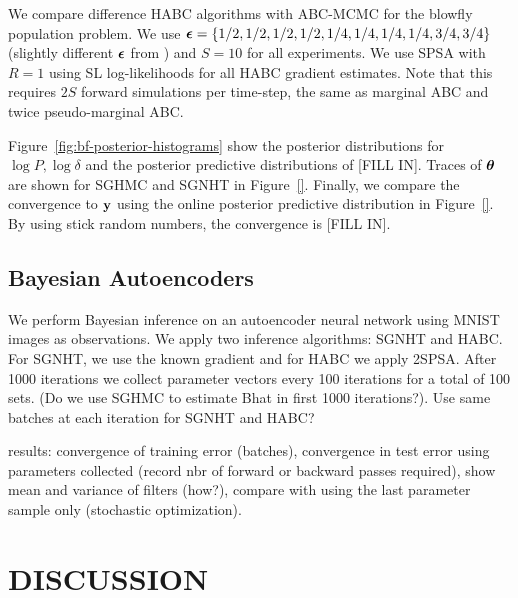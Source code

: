 \documentclass[]{article}
\begin{document}
We compare difference HABC algorithms with ABC-MCMC for the blowfly population problem.  We use ${\bm {\epsilon}} = \{ 1/2,1/2,1/2,1/2, 1/4,1/4,1/4,1/4,3/4,3/4 \}$ (slightly different ${\bm {\epsilon}}$ from \cite{Meeds2014GpsUai}) and $S=10$ for all experiments.  We use SPSA with $R=1$ using SL log-likelihoods for all HABC gradient estimates.  Note that this requires $2S$ forward simulations per time-step, the same as marginal ABC and twice pseudo-marginal ABC.  

Figure~\ref{fig:bf-posterior-histograms} show the posterior distributions for $\log P, \log \delta$ and the posterior predictive distributions of [FILL IN].  Traces of ${\bm \theta}$ are shown for SGHMC and SGNHT in Figure~\ref{}.  Finally, we compare the convergence to ${\bf y}$ using the online posterior predictive distribution in Figure~\ref{}.  By using stick random numbers, the convergence is [FILL IN].
  



\subsection{Bayesian Autoencoders}\label{sec:auto}
We perform Bayesian inference on an autoencoder neural network using MNIST images as observations.  We apply two inference algorithms: SGNHT and HABC.  For SGNHT, we use the known gradient and for HABC we apply 2SPSA.  After 1000 iterations we collect parameter vectors every 100 iterations for a total of 100 sets. (Do we use SGHMC to estimate Bhat in first 1000 iterations?).  Use same batches at each iteration for SGNHT and HABC? 

results: convergence of training error (batches), convergence in test error using parameters collected (record nbr of forward or backward passes required), show mean and variance of filters (how?), compare with using the last parameter sample only (stochastic optimization).





\section{DISCUSSION} \label{sec:discussion}
\end{document}
